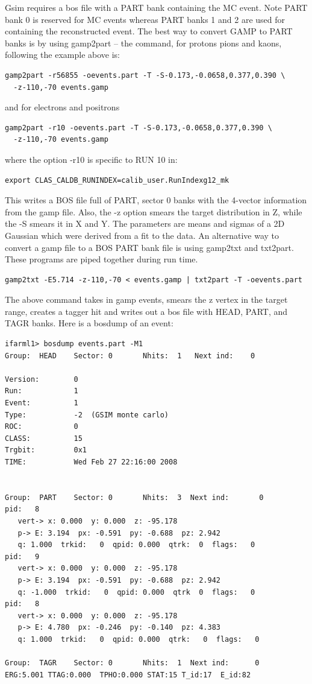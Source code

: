 Gsim requires a bos file with a PART bank containing the MC event. Note PART bank 0 is reserved for MC events whereas PART banks 1 and 2 are used for containing the reconstructed event. The best way to convert GAMP to PART banks is by using gamp2part -- the command, for protons pions and kaons, following the example above is:
\begin{verbatim}
gamp2part -r56855 -oevents.part -T -S-0.173,-0.0658,0.377,0.390 \
  -z-110,-70 events.gamp
\end{verbatim}
and for electrons and positrons
\begin{verbatim}
gamp2part -r10 -oevents.part -T -S-0.173,-0.0658,0.377,0.390 \
  -z-110,-70 events.gamp
\end{verbatim}
where the option -r10 is specific to RUN 10 in:
\begin{verbatim}
export CLAS_CALDB_RUNINDEX=calib_user.RunIndexg12_mk
\end{verbatim}
This writes a BOS file full of PART, sector 0 banks with the 4-vector information from the gamp file. Also, the -z option smears the target distribution in Z, while the -S smears it in X and Y. The parameters are means and sigmas of a 2D Gaussian which were derived from a fit to the data. An alternative way to convert a gamp file to a BOS PART bank file is using gamp2txt and txt2part. These programs are piped together during run time.
\begin{verbatim}
gamp2txt -E5.714 -z-110,-70 < events.gamp | txt2part -T -oevents.part
\end{verbatim}
The above command takes in gamp events, smears the z vertex in the target range, creates a tagger hit and writes out a bos file with HEAD, PART, and TAGR banks. Here is a bosdump of an event:
\begin{verbatim}
ifarml1> bosdump events.part -M1
Group:  HEAD    Sector: 0       Nhits:  1   Next ind:    0

Version:        0
Run:            1
Event:          1
Type:           -2  (GSIM monte carlo)
ROC:            0
CLASS:          15
Trgbit:         0x1
TIME:           Wed Feb 27 22:16:00 2008


Group:  PART    Sector: 0       Nhits:  3  Next ind:       0
pid:   8
   vert-> x: 0.000  y: 0.000  z: -95.178
   p-> E: 3.194  px: -0.591  py: -0.688  pz: 2.942
   q: 1.000  trkid:   0  qpid: 0.000  qtrk:  0  flags:   0
pid:   9
   vert-> x: 0.000  y: 0.000  z: -95.178
   p-> E: 3.194  px: -0.591  py: -0.688  pz: 2.942
   q: -1.000  trkid:   0  qpid: 0.000  qtrk  0  flags:   0
pid:   8
   vert-> x: 0.000  y: 0.000  z: -95.178
   p-> E: 4.780  px: -0.246  py: -0.140  pz: 4.383
   q: 1.000  trkid:   0  qpid: 0.000  qtrk:   0  flags:   0

Group:  TAGR    Sector: 0       Nhits:  1  Next ind:      0
ERG:5.001 TTAG:0.000  TPHO:0.000 STAT:15 T_id:17  E_id:82
\end{verbatim}

